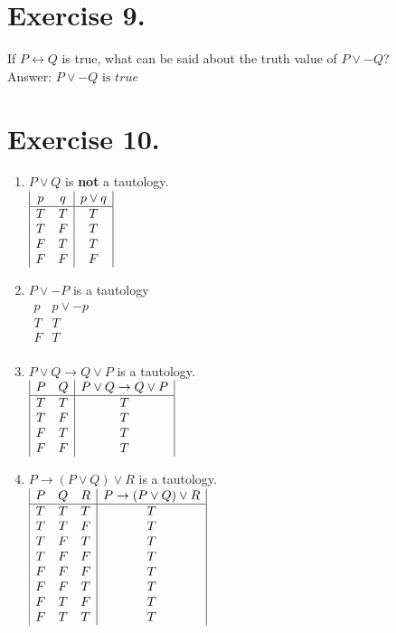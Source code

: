 \documentclass{article}
\begin{document}
\section*{Exercise 9.} 
If $P \leftrightarrow Q$ is true, what can be said about the truth value of $P \vee -Q$?\\
Answer: \(P \vee -Q \text{ is } true\)

\section*{Exercise 10.}
\begin{enumerate}[label=(\alph*)]

\item \(P \lor Q\) is \textbf{not} a tautology.\\
\(
\begin{array}{|c c|c|}
p & q & p \lor q\\
\hline
T & T & T\\
T & F & T\\
F & T & T\\
F & F & F\\
\end{array}
\)
\medskip

\item \(P \lor -P\) is a tautology\\
\(
\begin{array}{|c|c|}
p & p \lor -p\\
\hline
T & T\\
F & T\\
\end{array}
\)
\medskip

\item \(P \lor Q \rightarrow Q \lor P\) is a tautology.\\
\(
\begin{array}{|c c|c|}
P & Q & P \lor Q \rightarrow Q \lor P\\
\hline
T & T & T\\
T & F & T\\
F & T & T\\
F & F & T\\
\end{array}
\)
\medskip

\item \(P \rightarrow (P \lor Q) \lor R\) is a tautology.\\
\(
\begin{array}{|c c c|c|}
P & Q & R & P \rightarrow (P \lor Q) \lor R\\
\hline
T & T & T & T\\
T & T & F & T\\
T & F & T & T\\
T & F & F & T\\
F & F & F & T\\
F & F & T & T\\
F & T & F & T\\
F & T & T & T\\
\end{array}
\)
\medskip


\end{enumerate}
\end{document}
